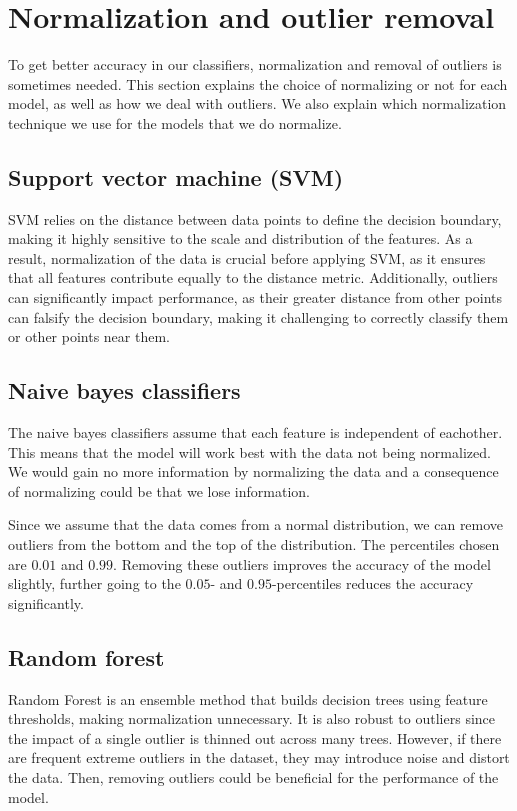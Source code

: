 \section{Normalization and outlier removal}

To get better accuracy in our classifiers, normalization and removal of outliers is sometimes needed. This section explains the choice of normalizing or not for each model, as well as how we deal with outliers. We also explain which normalization technique we use for the models that we do normalize. 

\subsection{Support vector machine (SVM)}
SVM relies on the distance between data points to define the decision boundary, making it highly sensitive to the scale and distribution of the features. As a result, normalization of the data is crucial before applying SVM, as it ensures that all features contribute equally to the distance metric.
Additionally, outliers can significantly impact performance, as their greater distance from other points can falsify the decision boundary, making it challenging to correctly classify them or other points near them.
\subsection{Naive bayes classifiers}

The naive bayes classifiers assume that each feature is independent of eachother. This means that the model will work best with the data not being normalized. We would gain no more information by normalizing the data and a consequence of normalizing could be that we lose information.
\par
Since we assume that the data comes from a normal distribution, we can remove outliers from the bottom and the top of the distribution. The percentiles chosen are $0.01$ and $0.99$. Removing these outliers improves the accuracy of the model slightly, further going to the $0.05$- and $0.95$-percentiles reduces the accuracy significantly.

\subsection{Random forest}
Random Forest is an ensemble method that builds decision trees using feature thresholds, making normalization unnecessary.
It is also robust to outliers since the impact of a single outlier is thinned out across many trees.
However, if there are frequent extreme outliers in the dataset, they may introduce noise and distort the data. Then, removing outliers could be beneficial for the performance of the model.